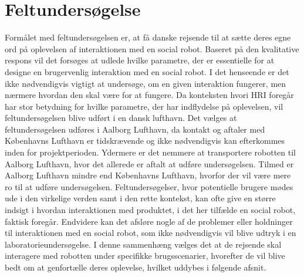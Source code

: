 \chapter{Feltundersøgelse}
\label{Feltundersoegelse}
%
Formålet med feltundersøgelsen er, at få danske rejsende til at sætte deres egne ord på oplevelsen af interaktionen med en social robot. Baseret på den kvalitative respons vil det forsøges at udlede hvilke parametre, der er essentielle for at designe en brugervenlig interaktion med en social robot. I det henseende er det ikke nødvendigvis vigtigt at undersøge, om en given interaktion fungerer, men nærmere hvordan den skal være for at fungere. Da konteksten hvori HRI foregår har stor betydning for hvilke parametre, der har indflydelse på oplevelsen, vil feltundersøgelsen blive udført i en dansk lufthavn. Det vælges at feltundersøgelsen udføres i Aalborg Lufthavn, da kontakt og aftaler med Københavns Lufthavn er tidskrævende og ikke nødvendigvis kan efterkommes inden for projektperioden. Ydermere er det nemmere at transportere robotten til Aalborg Lufthavn, hvor det allerede er aftalt at udføre undersøgelsen. Tilmed er Aalborg Lufthavn mindre end Københavns Lufthavn, hvorfor der vil være mere ro til at udføre undersøgelsen.\blankline
%
Feltundersøgelser, hvor potentielle brugere mødes ude i den virkelige verden samt i den rette kontekst, kan ofte give en større indsigt i hvordan interaktionen med produktet, i det her tilfælde en social robot, faktisk foregår. Endvidere kan det afsløre nogle af de problemer eller holdninger til interaktionen med en social robot, som ikke nødvendigvis vil blive udtryk i en laboratorieundersøgelse. I denne sammenhæng vælges det at de rejsende skal interagere med robotten under specifikke brugsscenarier, hvorefter de vil blive bedt om at genfortælle deres oplevelse, hvilket uddybes i følgende afsnit.   
